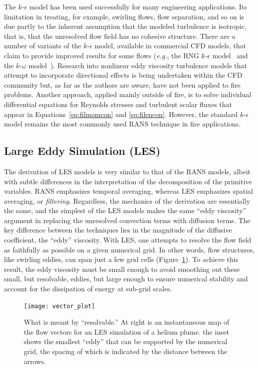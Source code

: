 \documentclass[graybox]{svmult}
\begin{document}
The $k$-$\epsilon$  model has been used successfully for many engineering applications. Its limitation in treating, for example, swirling flows, flow separation, and so on is due partly to the inherent assumption that the modeled turbulence is isotropic, that is, that the unresolved flow field has no cohesive structure. There are a number of variants of the $k$-$\epsilon$  model, available in commercial CFD models, that claim to provide improved results for some flows ({\em e.g.}, the RNG $k$-$\epsilon$  model~\cite{Yakhot} and the $k$-$\omega$ model~\cite{Wilcox}). Research into nonlinear eddy viscosity turbulence models that attempt to incorporate  directional  effects  is  being  undertaken within the CFD community but, as far as the authors are aware, have not been applied to fire problems. Another approach, applied mainly  outside  of fire, is to solve individual differential equations for Reynolds stresses and turbulent scalar fluxes that appear in Equations~\ref{eq:filmomcon} and \ref{eq:filencon}. However, the standard $k$-$\epsilon$ model remains the most commonly used RANS technique in fire applications.


\subsection{Large Eddy Simulation (LES)}

The derivation of LES models is very similar to that of the RANS models, albeit with subtle differences in the interpretation of the decomposition of the primitive variables. RANS emphasizes temporal averaging, whereas LES emphasizes spatial averaging, or {\em filtering}. Regardless, the mechanics of the derivation are essentially the same, and the simplest of the LES models makes the same ``eddy viscosity'' argument in replacing the unresolved convection terms with diffusion terms. The key difference between the techniques lies in the magnitude of the diffusive coefficient, the ``eddy'' viscosity. With LES, one attempts to resolve the flow field as faithfully as possible on a given numerical grid. In other words, flow structures, like swirling eddies, can span just a few grid cells (Figure~\ref{vector_plot}). To achieve this result, the eddy viscosity must be small enough to avoid smoothing out these small, but resolvable, eddies, but large enough to ensure numerical stability and account for the dissipation of energy at sub-grid scales.

\begin{figure}[b]
\texttt{[image: vector\_plot]}
\caption{What is meant by ``resolvable.'' At right is an instantaneous map of the flow vectors for an LES simulation of a helium plume. the inset shows the smallest ``eddy'' that can be supported by the numerical grid, the spacing of which is indicated by the distance between the arrows.}
\label{vector_plot}
\end{figure}
\end{document}
